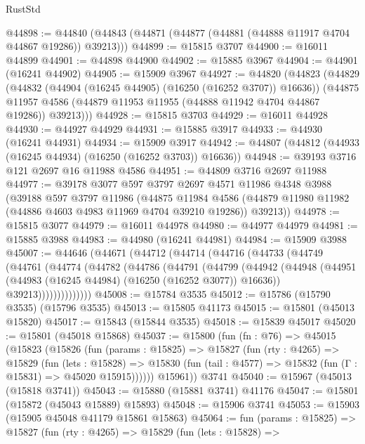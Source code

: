 \begin{lexlean}{RustStd}
\begin{coremodule}
@44898 := @44840 (@44843 (@44871 (@44877 (@44881 (@44888 @11917 @4704 @44867 @19286)) @39213)))
@44899 := @15815 @3707
@44900 := @16011 @44899
@44901 := @44898 @44900
@44902 := @15885 @3967
@44904 := @44901 (@16241 @44902)
@44905 := @15909 @3967
@44927 := @44820
    (@44823
      (@44829
        (@44832 (@44904 (@16245 @44905) (@16250 (@16252 @3707)) @16636))
        (@44875 @11957 @4586 (@44879 @11953 @11955 (@44888 @11942 @4704 @44867 @19286)) @39213)))
@44928 := @15815 @3703
@44929 := @16011 @44928
@44930 := @44927 @44929
@44931 := @15885 @3917
@44933 := @44930 (@16241 @44931)
@44934 := @15909 @3917
@44942 := @44807 (@44812 (@44933 (@16245 @44934) (@16250 (@16252 @3703)) @16636))
@44948 := @39193 @3716 @121 @2697 @16 @11988 @4586
@44951 := @44809 @3716 @2697 @11988
@44977 := @39178
    @3077
    @597
    @3797
    @2697
    @4571
    @11986
    @4348
    @3988
    (@39188
      @597
      @3797
      @11986
      (@44875
        @11984
        @4586
        (@44879 @11980 @11982 (@44886 @4603 @4983 @11969 @4704 @39210 @19286))
        @39213))
@44978 := @15815 @3077
@44979 := @16011 @44978
@44980 := @44977 @44979
@44981 := @15885 @3988
@44983 := @44980 (@16241 @44981)
@44984 := @15909 @3988
@45007 := @44646
    (@44671
      (@44712
        (@44714
          (@44716
            (@44733
              (@44749
                (@44761
                  (@44774
                    (@44782
                      (@44786
                        (@44791
                          (@44799
                            (@44942
                              (@44948
                                (@44951 (@44983 (@16245 @44984) (@16250 (@16252 @3077)) @16636))
                                @39213))))))))))))))
@45008 := @15784 @3535
@45012 := @15786 (@15790 @3535) (@15796 @3535)
@45013 := @15805 @41173
@45015 := @15801 (@45013 @15820)
@45017 := @15843 (@15844 @3535)
@45018 := @15839 @45017
@45020 := @15801 (@45018 @15868)
@45037 := @15800
    (fun (fn : @76) =>
    @45015
      (@15823
        (@15826
          (fun (params : @15825) =>
          @15827
            (fun (rty : @4265) =>
            @15829
              (fun (lets : @15828) =>
              @15830 (fun (tail : @4577) => @15832 (fun (Γ : @15831) => @45020 @15915))))))
        @15961))
    @3741
@45040 := @15967 (@45013 (@15818 @3741))
@45043 := @15880 (@15881 @3741) @41176
@45047 := @15801 (@15872 (@45043 @15889) @15893)
@45048 := @15906 @3741
@45053 := @15903 (@15905 @45048 @41179 @15861 @15863)
@45064 := fun (params : @15825) =>
  @15827
    (fun (rty : @4265) =>
    @15829
      (fun (lets : @15828) =>

\end{coremodule}
\end{lexlean}
